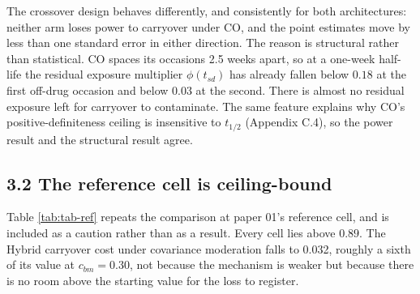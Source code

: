 \documentclass[
  11pt,
]{article}
\begin{document}
The crossover design behaves differently, and consistently for both
architectures: neither arm loses power to carryover under CO, and the
point estimates move by less than one standard error in either
direction. The reason is structural rather than statistical. CO
spaces its occasions 2.5 weeks apart, so at a one-week half-life the
residual exposure multiplier \(\phi(t_{sd})\) has already fallen below
\(0.18\) at the first off-drug occasion and below \(0.03\) at the second.
There is almost no residual exposure left for carryover to
contaminate. The same feature explains why CO's positive-definiteness
ceiling is insensitive to \(t_{1/2}\) (Appendix C.4), so the power
result and the structural result agree.

\subsection{3.2 The reference cell is ceiling-bound}

\begin{table}
\centering
\caption{\label{tab:tab-ref}The same comparison at paper 01's reference cell
    ($c_{bm} = 0.45$, $N = 70$). Every entry lies above $0.89$, so the
    architecture contrast is compressed by a ceiling effect and the
    carryover cost is understated.}
\centering
{}
\end{table}

Table \ref{tab:tab-ref} repeats the comparison at paper 01's
reference cell, and is included as a caution rather than as a result.
Every cell lies above \(0.89\). The Hybrid carryover cost under
covariance moderation falls to
0.032,
roughly a sixth of its value at \(c_{bm} = 0.30\), not because the
mechanism is weaker but because there is no room above the starting
value for the loss to register.
\end{document}

